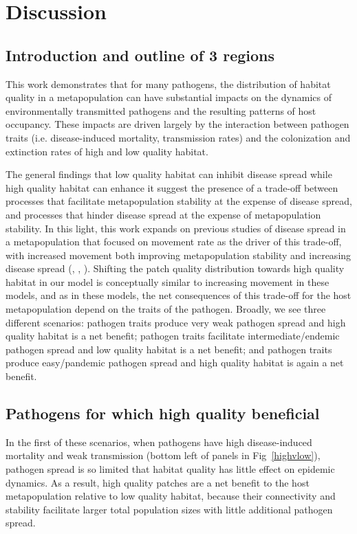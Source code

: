 \documentclass{article}
\begin{document}
\section{Discussion}
\label{discussion} 

\subsection*{Introduction and outline of 3 regions}

This work demonstrates that for many pathogens, the distribution of habitat quality in a metapopulation can have substantial impacts on the dynamics of environmentally transmitted pathogens and the resulting patterns of host occupancy.  
These impacts are driven largely by the interaction between pathogen traits (i.e. disease-induced mortality, transmission rates) and the colonization and extinction rates of high and low quality habitat.
 
The general findings that low quality habitat can inhibit disease spread while high quality habitat can enhance it suggest the presence of a trade-off between processes that facilitate metapopulation stability at the expense of disease spread, and processes that hinder disease spread at the expense of metapopulation stability.
In this light, this work expands on previous studies of disease spread in a metapopulation that focused on movement rate as the driver of this trade-off, with increased movement both improving metapopulation stability and increasing disease spread (\cite{Hess1996}, \cite{Gog2002}, \cite{Park2012}).  
Shifting the patch quality distribution towards high quality habitat in our model is  conceptually similar to increasing movement in these models, and as in these models, the net consequences of this trade-off for the host metapopulation depend on the traits of the pathogen.
Broadly, we see three different scenarios: pathogen traits produce very weak pathogen spread and high quality habitat is a net benefit; pathogen traits facilitate intermediate/endemic pathogen spread and low quality habitat is a net benefit; and pathogen traits produce easy/pandemic pathogen spread and high quality habitat is again a net benefit.  

\subsection*{Pathogens for which high quality beneficial}

In the first of these scenarios, when pathogens have high disease-induced mortality and weak transmission (bottom left of panels in Fig~\ref{highvlow}), pathogen spread is so limited that habitat quality has little effect on epidemic dynamics.
As a result, high quality patches are a net benefit to the host metapopulation relative to low quality habitat, because their connectivity and stability facilitate larger total population sizes with little additional pathogen spread.
\end{document}
